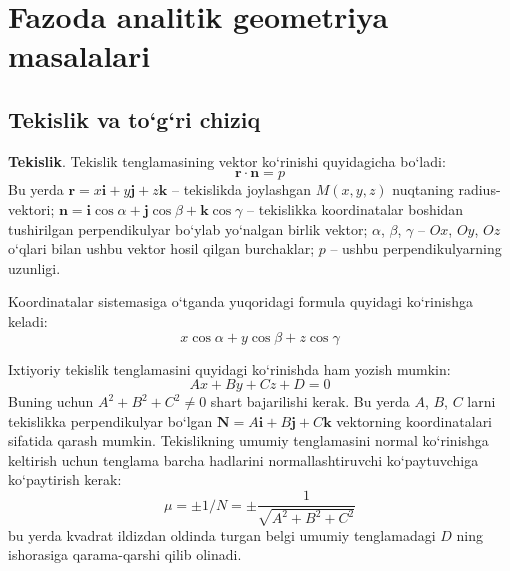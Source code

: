\chapter{Fazoda analitik geometriya masalalari}
\section{Tekislik va to`g`ri chiziq}
\textbf{Tekislik}.
Tekislik tenglamasining vektor ko`rinishi quyidagicha bo`ladi:
$$\textbf{r}\cdot\textbf{n}=p$$
Bu yerda $\textbf{r}=x\textbf{i}+y\textbf{j}+z\textbf{k}$ -- tekislikda joylashgan $M(x,y,z)$ nuqtaning radius-vektori; $\textbf{n}=\textbf{i}\cos\alpha+\textbf{j}\cos\beta+\textbf{k}\cos\gamma$ -- tekislikka koordinatalar boshidan tushirilgan perpendikulyar bo`ylab yo`nalgan birlik vektor; $\alpha$, $\beta$, $\gamma$ -- $Ox$, $Oy$, $Oz$ o`qlari bilan ushbu vektor hosil qilgan burchaklar; $p$ -- ushbu perpendikulyarning uzunligi.

Koordinatalar sistemasiga o`tganda yuqoridagi formula quyidagi ko`rinishga keladi:
\begin{equation}x\cos\alpha+ y\cos\beta+z\cos\gamma\end{equation}

Ixtiyoriy tekislik tenglamasini quyidagi ko`rinishda ham yozish mumkin:
\begin{equation}
	Ax+By+Cz+D=0
\end{equation}
Buning uchun $A^2+B^2+C^2\ne0$ shart bajarilishi kerak. Bu yerda $A$, $B$, $C$ larni tekislikka perpendikulyar bo`lgan $\textbf{N}=A\textbf{i}+B\textbf{j}+C\textbf{k}$ vektorning koordinatalari sifatida qarash mumkin. Tekislikning umumiy tenglamasini normal ko`rinishga keltirish uchun tenglama barcha hadlarini normallashtiruvchi ko`paytuvchiga ko`paytirish kerak:
\begin{equation}
	\mu=\pm1/N=\pm\frac{1}{\sqrt{A^2+B^2+C^2}}
\end{equation}
bu yerda kvadrat ildizdan oldinda turgan belgi umumiy tenglamadagi $D$ ning ishorasiga qarama-qarshi qilib olinadi.

